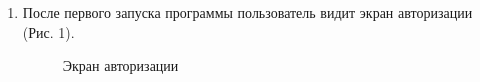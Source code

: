 \documentclass{../includes/TechDoc}
\begin{document}
    \begin{enumerate}
        \item После первого запуска программы пользователь видит экран авторизации (Рис. 1).
        \begin{figure}[h]
            \centering
            \caption{Экран авторизации}
            \label{fig:mpr}
        \end{figure}


\end{enumerate}
\end{document}
